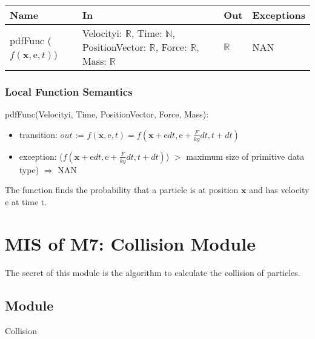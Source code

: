 \documentclass[12pt, titlepage]{article}
\begin{document}
\begin{center}
	\begin{tabular}{p{2cm} p{3cm} p{4cm} p{2cm}}
		\hline
		\textbf{Name} & \textbf{In} & \textbf{Out} & \textbf{Exceptions} \\
		\hline
		pdfFunc ($f(\mathrm{\textbf{x}},\mathrm{e},t)$) & Velocityi: $\mathbb{R}$, Time: $\mathbb{N}$, PositionVector: $\mathbb{R}$, Force: $\mathbb{R}$, Mass: $\mathbb{R}$ & $\mathbb{R}$ & NAN \\
		\hline
	\end{tabular}
\end{center}

\subsubsection{Local Function Semantics}

\noindent pdfFunc(Velocityi, Time, PositionVector, Force, Mass):
\begin{itemize}
	\item transition: $out$ := $f(\mathrm{\textbf{x}},\mathrm{e},t) = f(\mathrm{\textbf{x}} +\mathrm{e}dt, \mathrm{e} + \frac{F}{kg}dt, t + dt)$
	\item exception: ($f(\mathrm{\textbf{x}} +\mathrm{e}dt, \mathrm{e} + \frac{F}{kg}dt, t + dt)$) $>$ maximum size of primitive data type) $\Rightarrow$ NAN
\end{itemize}

The function finds the probability that a particle is at position $\textbf{x}$ and has velocity $\mathrm{e}$ at time t.\\

\newpage

\section{MIS of M7: Collision Module} \label{COModule} 

The secret of this module is the algorithm to calculate the collision of particles.

\subsection{Module}

Collision
\end{document}
